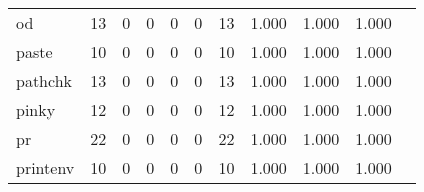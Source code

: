 \begin{longtable}{lp{1.2cm}p{1.2cm}p{1.2cm}p{1.2cm}p{1.2cm}p{1.2cm}p{1.2cm}p{1.2cm}p{1.2cm}p{1.2cm}}
od        &                                    13 &                                                  0 &                                                  0 &                                                  0 &                                                  0 &                                                 13 &                                              1.000 &                                              1.000 &                                              1.000 \\
paste     &                                    10 &                                                  0 &                                                  0 &                                                  0 &                                                  0 &                                                 10 &                                              1.000 &                                              1.000 &                                              1.000 \\
pathchk   &                                    13 &                                                  0 &                                                  0 &                                                  0 &                                                  0 &                                                 13 &                                              1.000 &                                              1.000 &                                              1.000 \\
pinky     &                                    12 &                                                  0 &                                                  0 &                                                  0 &                                                  0 &                                                 12 &                                              1.000 &                                              1.000 &                                              1.000 \\
pr        &                                    22 &                                                  0 &                                                  0 &                                                  0 &                                                  0 &                                                 22 &                                              1.000 &                                              1.000 &                                              1.000 \\
printenv  &                                    10 &                                                  0 &                                                  0 &                                                  0 &                                                  0 &                                                 10 &                                              1.000 &                                              1.000 &                                              1.000 \\

\end{longtable}

